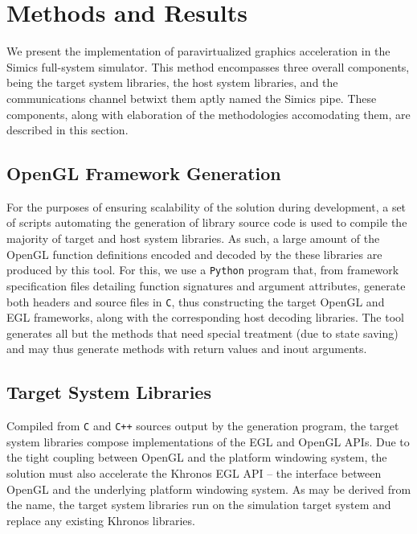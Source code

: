 
\section{Methods and Results}
\label{sec:methodsandresults}
We present the implementation of paravirtualized graphics acceleration in the Simics full-system simulator.
This method encompasses three overall components, being the target system libraries, the host system libraries, and the communications channel betwixt them aptly named the Simics pipe.
These components, along with elaboration of the methodologies accomodating them, are described in this section.

\subsection{OpenGL Framework Generation}
\label{sec:proposedsolutionandimplementation_openglabigeneration}
For the purposes of ensuring scalability of the solution during development, a set of scripts automating the generation of library source code is used to compile the majority of target and host system libraries.
As such, a large amount of the OpenGL function definitions encoded and decoded by the these libraries are produced by this tool.
For this, we use a \texttt{Python} program that, from framework specification files detailing function signatures and argument attributes, generate both headers and source files in \texttt{C}, thus constructing the target OpenGL and EGL frameworks, along with the corresponding host decoding libraries.
The tool generates all but the methods that need special treatment (due to state saving) and may thus generate methods with return values and inout arguments.

\subsection{Target System Libraries}
\label{sec:proposedsolutionandimplementation_targetsystemlibraries}
Compiled from \texttt{C} and \texttt{C++} sources output by the generation program, the target system libraries compose implementations of the EGL and OpenGL APIs.
Due to the tight coupling between OpenGL and the platform windowing system, the solution must also accelerate the Khronos EGL API -- the interface between OpenGL and the underlying platform windowing system.
As may be derived from the name, the target system libraries run on the simulation target system and replace any existing Khronos libraries.

